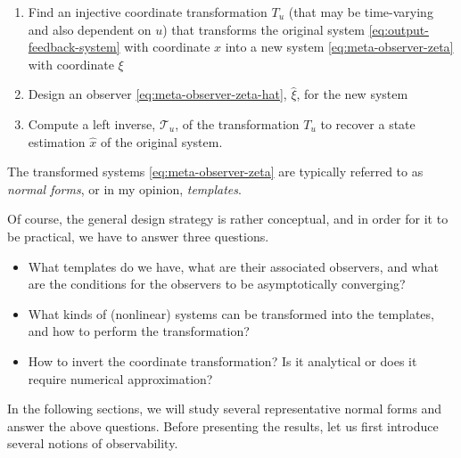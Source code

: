 \documentclass[
]{book}
\theoremstyle{definition}
\theoremstyle{definition}
\theoremstyle{definition}
\theoremstyle{definition}
\theoremstyle{remark}
\begin{document}
\begin{enumerate}
\def\labelenumi{\arabic{enumi}.}
\item
  Find an injective coordinate transformation \(T_u\) (that may be time-varying and also dependent on \(u\)) that transforms the original system \eqref{eq:output-feedback-system} with coordinate \(x\) into a new system \eqref{eq:meta-observer-zeta} with coordinate \(\xi\)
\item
  Design an observer \eqref{eq:meta-observer-zeta-hat}, \(\hat{\xi}\), for the new system
\item
  Compute a left inverse, \(\mathcal{T}_u\), of the transformation \(T_u\) to recover a state estimation \(\hat{x}\) of the original system.
\end{enumerate}

The transformed systems \eqref{eq:meta-observer-zeta} are typically referred to as \emph{normal forms}, or in my opinion, \emph{templates}.

Of course, the general design strategy is rather conceptual, and in order for it to be practical, we have to answer three questions.

\begin{itemize}
\item
  What templates do we have, what are their associated observers, and what are the conditions for the observers to be asymptotically converging?
\item
  What kinds of (nonlinear) systems can be transformed into the templates, and how to perform the transformation?
\item
  How to invert the coordinate transformation? Is it analytical or does it require numerical approximation?
\end{itemize}

In the following sections, we will study several representative normal forms and answer the above questions. Before presenting the results, let us first introduce several notions of observability.
\end{document}
